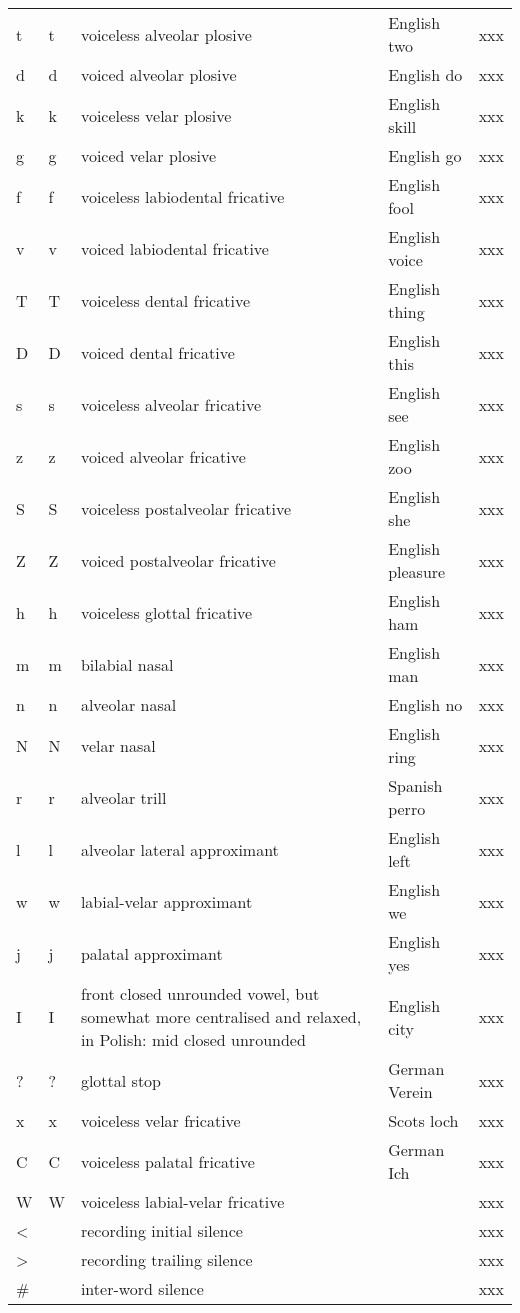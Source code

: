 \begin{longtable}{llp{}ll}
	t & t & voiceless alveolar plosive & English two & xxx\\
	d & d & voiced alveolar plosive & English do & xxx\\
	k & k & voiceless velar plosive & English skill & xxx\\
	g & g & voiced velar plosive & English go & xxx\\
	f & f & voiceless labiodental fricative & English fool & xxx\\
	v & v & voiced labiodental fricative & English voice & xxx\\
	T & T & voiceless dental fricative & English thing & xxx\\
	D & D & voiced dental fricative & English this & xxx\\
	s & s & voiceless alveolar fricative & English see & xxx\\
	z & z & voiced alveolar fricative & English zoo & xxx\\
	S & S & voiceless postalveolar fricative & English she & xxx\\
	Z & Z & voiced postalveolar fricative & English pleasure & xxx\\
	h & h & voiceless glottal fricative & English ham & xxx\\
	m & m & bilabial nasal & English man & xxx\\
	n & n & alveolar nasal & English no & xxx\\
	N & N & velar nasal & English ring & xxx\\
	r & r & alveolar trill & Spanish perro & xxx\\
	l & l & alveolar lateral approximant & English left & xxx\\
	w & w & labial-velar approximant & English we & xxx\\
	j & j & palatal approximant & English yes & xxx\\
	I & I & front closed unrounded vowel, but somewhat more centralised and relaxed, in Polish: mid closed unrounded & English city & xxx\\
	? & ? & glottal stop & German Verein & xxx\\
	x & x & voiceless velar fricative & Scots loch & xxx\\
	C & C & voiceless palatal fricative & German Ich & xxx\\
	W & W & voiceless labial-velar fricative & & xxx\\
	\textless & & recording initial silence & & xxx\\
	\textgreater & & recording trailing silence & & xxx\\
	\# & & inter-word silence & & xxx\\
\end{longtable}

